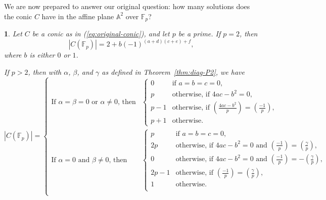 \documentclass[10pt,a4paper]{amsart}
\numberwithin{equation}{section}
\numberwithin{figure}{section}
\theoremstyle{definition}
\theoremstyle{remark}
\theoremstyle{plain}
\newtheorem{thm}{\protect\theoremname}[section]
\theoremstyle{plain}
\theoremstyle{definition}
\theoremstyle{plain}
\theoremstyle{plain}
\providecommand{\theoremname}{Theorem}
\newcommand{\legendre}[2]{\genfrac{(}{)}{}{}{#1}{#2}}
\newcommand{\A}{\mathbb{A}}
\newcommand{\F}{\mathbb{F}}
\begin{document}
	We are now prepared to answer our original question: how many solutions does the conic $C$ have in the affine plane $\A^2$ over $\F_p$? 
	
    \begin{thm}
	Let $C$ be a conic as in (\ref{eq:original-conic}), and let $p$ be a prime. If $p=2$, then
	\begin{equation*}
	|C(\F_p)|=2 + b(-1)^{(a+d)(c+e) + f},
	\end{equation*}
	where $b$ is either $0$ or $1$.
	
	If $p > 2$, then with $\alpha$, $\beta$, and $\gamma$ as defined in Theorem~\ref{thm:diag-P2}, we have
	\begin{equation*}
	|C(\F_p)|=\begin{cases}
	\textrm{If }\alpha=\beta=0\textrm{ or }\alpha\ne 0\textrm{, then}&\begin{cases}
	0&\textrm{if }a=b=c=0,\\
	p&\textrm{otherwise, if }4ac-b^2=0,\\
	p-1&\textrm{otherwise, if }\legendre{4ac-b^2}{p}=\legendre{-1}{p},\\
	p+1&\textrm{otherwise.}
	\end{cases}\\
	\textrm{If }\alpha=0\textrm{ and }\beta\ne 0\textrm{, then}&\begin{cases}
	p&\textrm{if }a=b=c=0,\\
	2p&\textrm{otherwise, if }4ac-b^2=0\textrm{ and }\legendre{-1}{p}=\legendre{\gamma}{p},\\
	0&\textrm{otherwise, if }4ac-b^2=0\textrm{ and }\legendre{-1}{p}=-\legendre{\gamma}{p},\\
	2p-1&\textrm{otherwise, if }\legendre{-1}{p}=\legendre{\gamma}{p},\\
	1&\textrm{otherwise.}\\
	\end{cases}\\
	\end{cases}
	\end{equation*}
	
	\end{thm}
\end{document}
